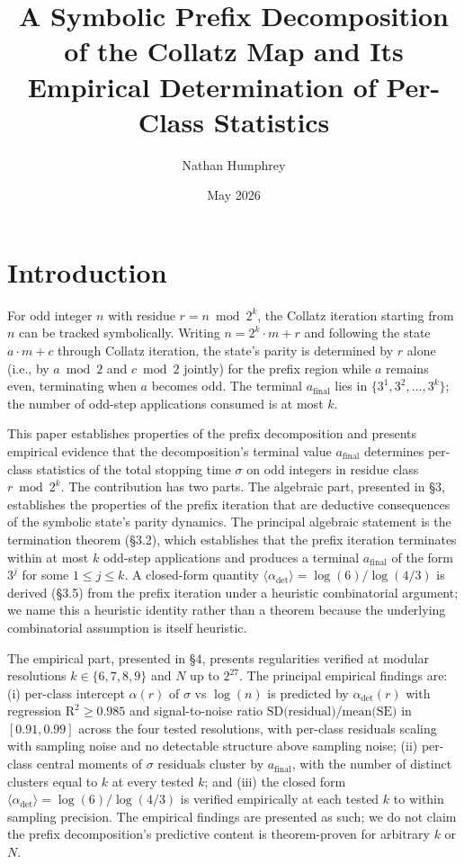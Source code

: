 \documentclass{article}
\title{A Symbolic Prefix Decomposition of the Collatz Map and Its Empirical Determination of Per-Class Statistics}
\author{Nathan Humphrey}
\date{May 2026}
\theoremstyle{plain}
\begin{document}
\maketitle

\section{Introduction}
For odd integer $n$ with residue $r = n \bmod 2^k$, the Collatz iteration starting from $n$ can be tracked symbolically. Writing $n=2^k \cdot m+r$ and following the state $a \cdot m + c$ through Collatz iteration, the state's parity is determined by $r$ alone (i.e., by $a\bmod 2$ and $c \bmod 2$ jointly) for the prefix region while $a$ remains even, terminating when $a$ becomes odd. The terminal $a_{\text{final}}$ lies in $\{3^1, 3^2, \ldots, 3^k\}$; the number of odd-step applications consumed is at most $k$.

This paper establishes properties of the prefix decomposition and presents empirical evidence that the decomposition's terminal value $a_{\text{final}}$ determines per-class statistics of the total stopping time $\sigma$ on odd integers in residue class $r \bmod 2^k$. The contribution has two parts. The algebraic part, presented in \S3, establishes the properties of the prefix iteration that are deductive consequences of the symbolic state's parity dynamics. The principal algebraic statement is the termination theorem (\S3.2), which establishes that the prefix iteration terminates within at most $k$ odd-step applications and produces a terminal $a_{\text{final}}$ of the form $3^j$ for some $1 \leq j \leq k$. A closed-form quantity $\langle \alpha_{\text{det}} \rangle = \log(6)/ \log(4/3)$ is derived (\S3.5) from the prefix iteration under a heuristic combinatorial argument; we name this a heuristic identity rather than a theorem because the underlying combinatorial assumption is itself heuristic.

The empirical part, presented in \S4, presents regularities verified at modular resolutions $k \in \{6, 7, 8, 9\}$ and $N$ up to $2^{27}$. The principal empirical findings are: (i) per-class intercept $\alpha(r)$ of $\sigma$ vs $\log(n)$ is predicted by $\alpha_{\text{det}}(r)$ with regression $\text{R}^2 \geq 0.985$ and signal-to-noise ratio $\text{SD(residual)} / \text{mean(SE)}$ in $[0.91, 0.99]$ across the four tested resolutions, with per-class residuals scaling with sampling noise and no detectable structure above sampling noise; (ii) per-class central moments of $\sigma$ residuals cluster by $a_{\text{final}}$, with the number of distinct clusters equal to $k$ at every tested $k$; and (iii) the closed form $\langle \alpha_{\text{det}} \rangle = \log(6)/ \log(4/3)$ is verified empirically at each tested $k$ to within sampling precision. The empirical findings are presented as such; we do not claim the prefix decomposition's predictive content is theorem-proven for arbitrary $k$ or $N$.
\end{document}
